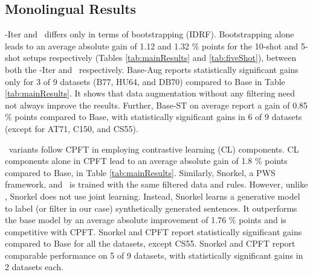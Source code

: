 \subsection{Monolingual Results}

\our-Iter and \our~differs only in terms of bootstrapping (IDRF). %
Bootstrapping alone leads to an average absolute gain of 1.12 and 1.32 \% points for the 10-shot and 5-shot setups respectively (Tables \ref{tab:mainResults} and \ref{tab:fiveShot}), between both the \our-Iter and \our~respectively. %
Base-Aug reports statistically significant gains only for 3 of 9 datasets (B77, HU64, and DB70) compared to Base in Table \ref{tab:mainResults}. It shows that data augmentation without any filtering need not always improve the results. Further, Base-ST %
on average report a gain of 0.85 \% points compared to Base, with statistically significant gains in 6 of 9 datasets (except for AT71, C150, and CS55). %

\our~variants follow CPFT \cite{zhang-etal-2022-contrastive} in employing contrastive learning (CL) components.   %
CL components alone in CPFT lead to an average absolute gain of 1.8 \% points compared to Base, in Table \ref{tab:mainResults}. Similarly, Snorkel, a PWS framework, and \our~is trained with the same filtered data and rules. However, unlike \our, Snorkel does not use joint learning. Instead, Snorkel learns a generative model to label (or filter in our case) synthetically generated sentences. It outperforms the base model by an average absolute improvement of 1.76 \% points and is competitive with CPFT. Snorkel and CPFT report statistically significant gains compared to Base for all the datasets, except CS55.  Snorkel and CPFT report comparable performance on 5 of 9 datasets, with statistically significant gains in 2 datasets each. %

